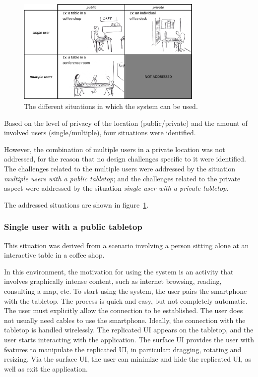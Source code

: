 \begin{figure}[htb]
  \centering
    \includegraphics[width=0.8\textwidth]{images/marietable}
    \caption{The different situations in which the system can be used.}
    \label{fig:scenarios}
\end{figure}

Based on the level of privacy of the location (public/private) and the amount of involved users (single/multiple), four situations were identified.

However, the combination of multiple users in a private location was not addressed, for the reason that no design challenges specific to it were identified.
The challenges related to the multiple users were addressed by the situation \emph{multiple users with a public tabletop}; and the challenges related to the private aspect were addressed by the situation \emph{single user with a private tabletop}. 

The addressed situations are shown in figure~\ref{fig:scenarios}.

\subsubsection{Single user with a public tabletop}

This situation was derived from a scenario involving a person sitting alone at an interactive table in a coffee shop.

In this environment, the motivation for using the system is an activity that involves graphically intense content, such as 
internet browsing, reading, consulting a map, etc.
To start using the system, the user pairs the smartphone with the tabletop.
The process is quick and easy, but not completely automatic.
The user must explicitly allow the connection to be established.
The user does not usually need cables to use the smartphone.
Ideally, the connection with the tabletop is handled wirelessly.
The replicated UI appears on the tabletop, and the user starts interacting with the application.
The surface UI provides the user with features to manipulate the replicated UI, in particular: dragging, rotating and resizing.
Via the surface UI, the user can minimize and hide the replicated UI, as well as exit the application.

